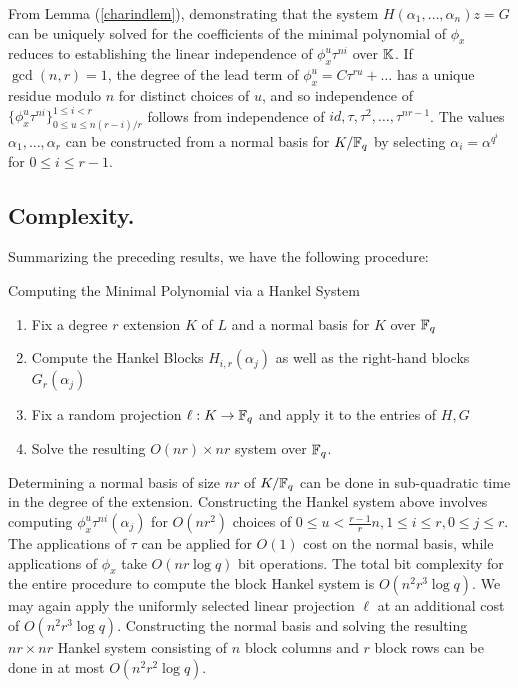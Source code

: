 From Lemma (\ref{charindlem}), demonstrating that the system $H(\alpha_1, \ldots, \alpha_{n})z = G$ can be uniquely solved for the coefficients of the minimal polynomial of $\phi_x$ reduces to establishing the linear independence of $\phi_x^{u}\tau^{ni}$ over $\mathbb{K}$.  If $\gcd(n,r) = 1$, the degree of the lead term of $\phi_x^u = C\tau^{ru} + \ldots$ has a unique residue modulo $n$ for distinct choices of $u$, and so independence of $\{ \phi_x^{u}\tau^{ni} \}_{0 \leq u \leq n(r-i)/r }^{1 \leq i < r}$ follows from independence of $id, \tau, \tau^2, \ldots, \tau^{nr-1}$. The values $\alpha_1, \ldots, \alpha_r$ can be constructed from a normal basis for $K/\mathbb{F}_q$ by selecting $\alpha_i = \alpha^{q^i}$ for $0 \leq i \leq r - 1$.

\subsection{Complexity.} Summarizing the preceding results, we have the following procedure:

\begin{algorithm}[H]\label{hankel}
\caption{Computing the Minimal Polynomial via a Hankel System }

\begin{enumerate}
    \item Fix a degree $r$ extension $K$ of $L$ and a normal basis for $K$ over $\mathbb{F}_q$
    \item Compute the Hankel Blocks $H_{i,r}(\alpha_j)$ as well as the right-hand blocks $G_r(\alpha_j)$
    \item Fix a random projection $\ell: K \to \mathbb{F}_q$ and apply it to the entries of $H, G$
    \item Solve the resulting $O(nr) \times nr$ system over $\mathbb{F}_q$.
\end{enumerate}
\end{algorithm}
Determining a normal basis of size $nr$ of $K/\mathbb{F}_q$ can be done in sub-quadratic time in the degree of the extension. Constructing the Hankel system above involves computing $\phi_x^{u}\tau^{ni}(\alpha_j)$ for $O(nr^2)$ choices of $0 \leq u < \frac{r-1}{r}n, 1 \leq i \leq r, 0 \leq j \leq r$. The applications of $\tau$ can be applied for $O(1)$ cost on the normal basis, while applications of $\phi_x$ take $O(nr \log q)$ bit operations. The total bit complexity for the entire procedure to compute the block Hankel system is $O(n^2r^3\log q)$. We may again apply the uniformly selected linear projection $\ell$ at an additional cost of $O(n^2r^3\log q)$. Constructing the normal basis and solving the resulting $nr \times nr$ Hankel system consisting of $n$ block columns and $r$ block rows can be done in at most $O(n^2r^2\log q)$.


